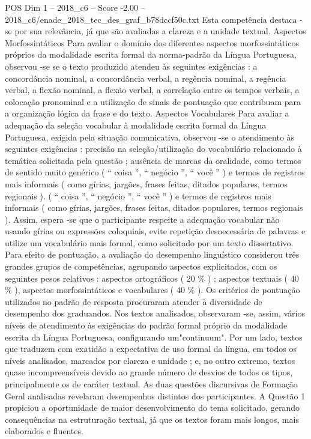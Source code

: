 \begin{textsample}{POS Dim 1 – 2018\_c6 – Score -2.00 – 2018\_c6/enade\_2018\_tec\_des\_graf\_b78dccf50c.txt}
Esta competência destaca -se por sua relevância, já que são avaliadas a clareza e a unidade textual.
Aspectos Morfossintáticos Para avaliar o domínio dos diferentes aspectos morfossintáticos próprios da modalidade escrita formal da norma-padrão da Língua Portuguesa, observou -se se o texto produzido atendeu às seguintes exigências : a concordância nominal, a concordância verbal, a regência nominal, a regência verbal, a flexão nominal, a flexão verbal, a correlação entre os tempos verbais, a colocação pronominal e a utilização de sinais de pontuação que contribuam para a organização lógica da frase e do texto.
Aspectos Vocabulares Para avaliar a adequação da seleção vocabular à modalidade escrita formal da Língua Portuguesa, exigida pela situação comunicativa, observou -se o atendimento às seguintes exigências : precisão na seleção/utilização do vocabulário relacionado à temática solicitada pela questão ; ausência de marcas da oralidade, como termos de sentido muito genérico ( “ coisa ”, “ negócio ”, “ você ” ) e termos de registros mais informais ( como gírias, jargões, frases feitas, ditados populares, termos regionais ). ( “ coisa ”, “ negócio ”, “ você ” ) e termos de registros mais informais ( como gírias, jargões, frases feitas, ditados populares, termos regionais ).
Assim, espera -se que o participante respeite a adequação vocabular não usando gírias ou expressões coloquiais, evite repetição desnecessária de palavras e utilize um vocabulário mais formal, como solicitado por um texto dissertativo.
Para efeito de pontuação, a avaliação do desempenho linguístico considerou três grandes grupos de competências, agrupando aspectos explicitados, com os seguintes pesos relativos : aspectos ortográficos ( 20 \% ) ; aspectos textuais ( 40 \% ), aspectos morfossintáticos e vocabulares ( 40 \% ).
Os critérios de pontuação utilizados no padrão de resposta procuraram atender à diversidade de desempenho dos graduandos.
Nos textos analisados, observaram -se, assim, vários níveis de atendimento às exigências do padrão formal próprio da modalidade escrita da Língua Portuguesa, configurando um"continuum".
Por um lado, textos que traduzem com exatidão a expectativa de uso formal da língua, em todos os níveis analisados, marcados por clareza e unidade ; e, no outro extremo, textos quase incompreensíveis devido ao grande número de desvios de todos os tipos, principalmente os de caráter textual.
As duas questões discursivas de Formação Geral analisadas revelaram desempenhos distintos dos participantes.
A Questão 1 propiciou a oportunidade de maior desenvolvimento do tema solicitado, gerando consequências na estruturação textual, já que os textos foram mais longos, mais elaborados e fluentes.

\end{textsample}
